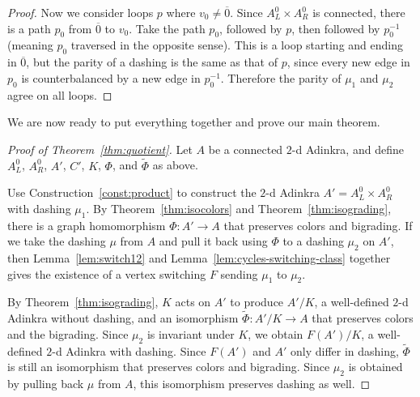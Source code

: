 \documentclass[12pt,twoside,singlespace]{article}
\numberwithin{equation}{section}
\theoremstyle{definition}
\begin{document}
\begin{proof}
Now we consider loops $p$ where $v_0\not=\overline{0}$.  Since $A_L^0\times A_R^0$ is connected, there is a path $p_0$ from $\overline{0}$ to $v_0$.  Take the path $p_0$, followed by $p$, then followed by $p_0^{-1}$ (meaning $p_0$ traversed in the opposite sense).  This is a loop starting and ending in $\overline{0}$, but the parity of a dashing is the same as that of $p$, since every new edge in $p_0$ is counterbalanced by a new edge in $p_0^{-1}$.  Therefore the parity of $\mu_1$ and $\mu_2$ agree on all loops.
\end{proof}

We are now ready to put everything together and prove our main theorem.

\begin{proof}[Proof of Theorem~\ref{thm:quotient}]
Let $A$ be a connected $2$-d Adinkra, and define $A_L^0$, $A_R^0$, $A'$, $C'$, $K$, $\Phi$, and $\tilde{\Phi}$ as above.

Use Construction~\ref{const:product} to construct the $2$-d Adinkra $A'=A_L^0\times A_R^0$ with dashing $\mu_1$.
By Theorem~\ref{thm:isocolors} and Theorem~\ref{thm:isograding}, there is a graph homomorphism $\Phi:A' \to A$ that preserves colors and bigrading.  If we take the dashing $\mu$ from $A$ and pull it back using $\Phi$ to a dashing $\mu_2$ on $A'$, then Lemma~\ref{lem:switch12} and Lemma~\ref{lem:cycles-switching-class} together gives the existence of a vertex switching $F$ sending $\mu_1$ to $\mu_2$.

By Theorem~\ref{thm:isograding}, $K$ acts on $A'$ to produce $A'/K$, a well-defined $2$-d Adinkra without dashing, and an isomorphism $\tilde{\Phi}:A'/K\to A$ that preserves colors and the bigrading.  Since $\mu_2$ is invariant under $K$, we obtain  $F(A')/K$, a well-defined $2$-d Adinkra with dashing. Since $F(A')$ and $A'$ only differ in dashing, $\tilde{\Phi}$ is still an isomorphism that preserves colors and bigrading.  Since $\mu_2$ is obtained by pulling back $\mu$ from $A$, this isomorphism preserves dashing as well.
\end{proof}
\end{document}
